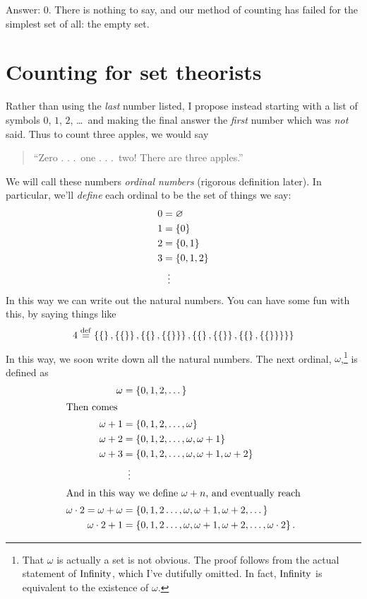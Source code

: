 Answer: $0$. There is nothing to say, and our method of counting has failed
for the simplest set of all: the empty set.

\section{Counting for set theorists}
Rather than using the \emph{last} number listed, I propose instead
starting with a list of symbols $0$, $1$, $2$, \dots\ and making
the final answer the \emph{first} number which was \emph{not} said.
Thus to count three apples, we would say 
\begin{quote}
	``Zero . . .\ one . . .\ two!  There are three apples.''
\end{quote}
We will call these numbers \emph{ordinal numbers} (rigorous definition later).
In particular, we'll \emph{define} each ordinal to be the set of things we say:
\begin{align*}
	0 &= \varnothing \\
	1 &= \{0\} \\
	2 &= \{0,1\} \\
	3 &= \{0,1,2\} \\
	&\vdotswithin=
\end{align*}
In this way we can write out the natural numbers.
You can have some fun with this, by saying things like
\[
	4 \overset{\mathrm{def}}{=}
	\left\{ 
		\left\{  \right\},
		\left\{ \left\{  \right\} \right\},
		\left\{ \left\{  \right\}, \left\{ \left\{  \right\} \right\} \right\},
		\left\{ 
			\left\{  \right\},
			\left\{ \left\{  \right\} \right\},
			\left\{ \left\{  \right\}, \left\{ \left\{  \right\} \right\} \right\}
		\right\}
	\right\}
\]
In this way, we soon write down all the natural numbers.
The next ordinal, $\omega$,\footnote{
	That $\omega$ is actually a set is not obvious.
	The proof follows from the actual statement of $\mathrm{Infinity}$,
	which I've dutifully omitted.
	In fact, $\mathrm{Infinity}$ is equivalent to the existence of $\omega$.
} is defined as
\begin{align*}
	\omega &= \left\{ 0, 1, 2, \dots \right\} \\
	\intertext{Then comes}
	\omega+1 &= \left\{ 0, 1, 2, \dots, \omega \right\} \\
	\omega+2 &= \left\{ 0, 1, 2, \dots, \omega, \omega+1 \right\} \\
	\omega+3 &= \left\{ 0, 1, 2, \dots, \omega, \omega+1, \omega+2 \right\} \\
	&\vdotswithin= \\
	\intertext{And in this way we define $\omega+n$, and eventually reach}
	\omega \cdot 2 = \omega+\omega &= \left\{ 0, 1, 2 \dots, \omega, \omega+1, \omega+2, \dots \right\} \\
	\omega \cdot 2 + 1 &= \left\{ 0, 1, 2 \dots, \omega, \omega+1, \omega+2, \dots, \omega \cdot 2 \right\}.
\end{align*}
